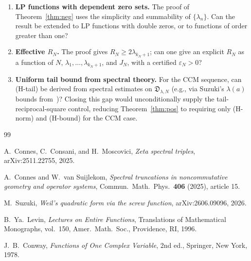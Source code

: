 \documentclass[12pt]{amsart}
\theoremstyle{definition}
\theoremstyle{remark}
\theoremstyle{plain}
\begin{document}
\begin{enumerate}
\item \textbf{LP functions with dependent zero sets.}
  The proof of Theorem~\ref{thm:neg} uses the simplicity and summability
  of $\{\lambda_n\}$.  Can the result be extended to LP functions with
  double zeros, or to functions of order greater than one?

\item \textbf{Effective $R_N$.}  The proof gives $R_N\geq 2\lambda_{k_N+1}$;
  can one give an explicit $R_N$ as a function of $N$, $\lambda_1,\ldots,
  \lambda_{k_N+1}$, and $J_N$, with a certified $\varepsilon_N>0$?

\item \textbf{Uniform tail bound from spectral theory.}
  For the CCM sequence, can (H-tail) be derived from spectral estimates
  on $\mathfrak{D}_{\lambda,N}$ (e.g., via Suzuki's $\lambda(a)$ bounds
  from~\cite{Suzuki2026})?  Closing this gap would unconditionally supply
  the tail-reciprocal-square control, reducing Theorem~\ref{thm:pos} to
  requiring only (H-norm) and (H-bound) for the CCM case.
\end{enumerate}

{\sloppy
\begin{thebibliography}{99}

A.~Connes, C.~Consani, and H.~Moscovici,
\emph{Zeta spectral triples},
arXiv:2511.22755, 2025.

A.~Connes and W.~van Suijlekom,
\emph{Spectral truncations in noncommutative geometry and operator systems},
Commun.\ Math.\ Phys.~\textbf{406} (2025), article 15.

M.~Suzuki,
\emph{Weil's quadratic form via the screw function},
arXiv:2606.09096, 2026.

B.~Ya.~Levin,
\emph{Lectures on Entire Functions},
Translations of Mathematical Monographs, vol.~150,
Amer.\ Math.\ Soc., Providence, RI, 1996.

J.~B.~Conway,
\emph{Functions of One Complex Variable},
2nd ed., Springer, New York, 1978.

\end{thebibliography}
}
\end{document}
